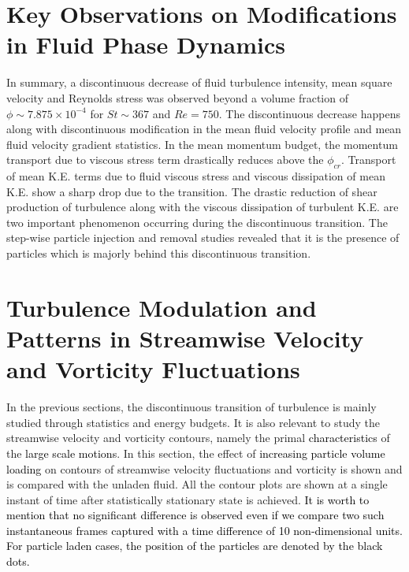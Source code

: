\documentclass[aip,graphicx]{revtex4-1}
\begin{document}
\section{Key Observations on Modifications in Fluid Phase Dynamics}
In summary, a discontinuous decrease of fluid turbulence intensity, mean square velocity and Reynolds stress was observed beyond a volume fraction of $\phi\sim 7.875\times10^{-4}$ for $St\sim367$ and $Re=750$. The discontinuous decrease happens along with discontinuous modification in the mean fluid velocity profile and mean fluid velocity gradient statistics. In the mean momentum budget, the momentum transport due to viscous stress term drastically reduces above the $\phi_{cr}$.
Transport of mean K.E. terms due to fluid viscous stress and viscous dissipation of mean K.E. show a sharp drop due to the transition. The drastic reduction of shear production of turbulence along with the viscous dissipation of turbulent K.E. are two important phenomenon occurring during the discontinuous transition. The step-wise particle injection and removal studies revealed that it is the presence of particles which is majorly behind this discontinuous transition.
\section{Turbulence Modulation and Patterns in Streamwise Velocity and Vorticity Fluctuations}
\label{sec:contours}
In the previous sections, the discontinuous transition of turbulence is mainly studied through statistics and energy budgets. It is also relevant to study the streamwise velocity and vorticity contours, namely the primal \textcolor{black}{characteristics} of the \textcolor{black}{large scale motions}. In this section, the effect of \textcolor{black}{increasing particle volume loading} on contours of streamwise velocity fluctuations and vorticity is shown and is compared with the unladen fluid. All the contour plots are shown at a single instant of time after statistically stationary state is achieved. 
\textcolor{black}{It is worth to mention that no significant difference is observed even if we compare two such instantaneous frames captured with a time difference of 10 non-dimensional units. For particle laden cases, the position of the particles are denoted by the black dots.}
\end{document}
